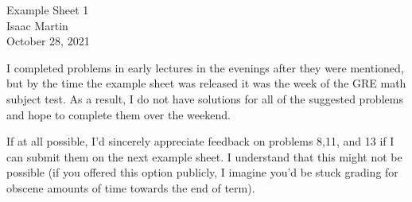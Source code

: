


\pagestyle{empty}
	\LARGE
\begin{center}
	Example Sheet 1\\
	\Large
	Isaac Martin \\
    October 28, 2021
\end{center}
\normalsize
\vspace{-2mm}
\hru

I completed problems in early lectures in the evenings after they were mentioned, but by the time the example sheet was released it was the week of the GRE math subject test. As a result, I do not have solutions for all of the suggested problems and hope to complete them over the weekend.

If at all possible, I'd sincerely appreciate feedback on problems 8,11, and 13 if I can submit them on the next example sheet. I understand that this might not be possible (if you offered this option publicly, I imagine you'd be stuck grading for obscene amounts of time towards the end of term).

\begin{homework}[e]
    \prob
    \prob
    \prob
    \prob
    \prob
    \prob
    \prob
\end{homework}

